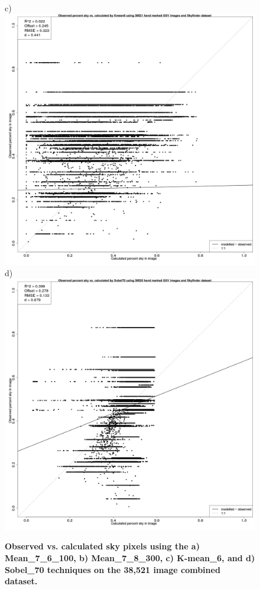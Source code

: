 \documentclass[final,3p,times,authoryear]{elsarticle}
\begin{document}
\begin{figure}
c)\includegraphics[scale=0.12]{Images/ErrorPlotsCombinedIndivKmean6.png}
d)\includegraphics[scale=0.12]{Images/ErrorPlotsCombinedIndivSobel70.png}
\caption{\textbf{Observed vs. calculated sky pixels using the a) Mean\_7\_6\_100, b) Mean\_7\_8\_300, c) K-mean\_6, and d) Sobel\_70 techniques on the 38,521 image combined dataset.} }
\label{fig:errorallcombined}
\end{figure}
\end{document}
